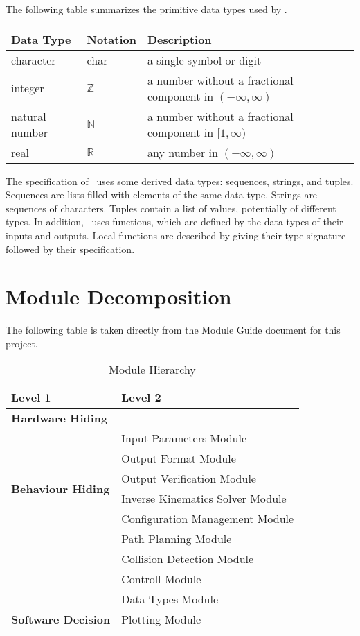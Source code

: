 \documentclass[12pt, titlepage]{article}
\begin{document}
The following table summarizes the primitive data types used by \progname. 

\begin{center}
  \renewcommand{\arraystretch}{1.2}
  \noindent 
  \begin{tabular}{l l p{7.5cm}} 
  \toprule 
  \textbf{Data Type} & \textbf{Notation} & \textbf{Description}\\ 
  \midrule
  character & char & a single symbol or digit\\
  integer & $\mathbb{Z}$ & a number without a fractional component in $(-\infty, \infty)$ \\[4pt]
  natural number & $\mathbb{N}$ & a number without a fractional component in $[1, \infty)$ \\[4pt]
  real & $\mathbb{R}$ & any number in $(-\infty, \infty)$\\[4pt]

  \bottomrule
  \end{tabular} 
  \end{center}

\noindent
The specification of \progname \ uses some derived data types: sequences, strings, and
tuples. Sequences are lists filled with elements of the same data type. Strings
are sequences of characters. Tuples contain a list of values, potentially of
different types. In addition, \progname \ uses functions, which
are defined by the data types of their inputs and outputs. Local functions are
described by giving their type signature followed by their specification.

\section{Module Decomposition}

The following table is taken directly from the Module Guide document for this project.


\begin{table}[h!]
  \centering
  \begin{tabular}{p{} p{}}
  \toprule
  \textbf{Level 1} & \textbf{Level 2}\\
  \midrule
  \textbf{Hardware Hiding} & \\ 
  \midrule
  \multirow{6}{0.3\textwidth}{\textbf{Behaviour Hiding}} 
  & Input Parameters Module \\ 
  & Output Format Module \\ 
  & Output Verification Module \\ 
  & Inverse Kinematics Solver Module \\ 
  & Configuration Management Module \\ 
  & Path Planning Module \\ 
  & Collision Detection Module \\ 
  & Controll Module\\
  & Data Types Module\\
  \midrule
  \multirow{1}{0.3\textwidth}{\textbf{Software Decision}} 
  & Plotting Module \\ 
  \bottomrule
  \end{tabular}
  \caption{Module Hierarchy}
  \label{TblMH}
\end{table}
\end{document}

